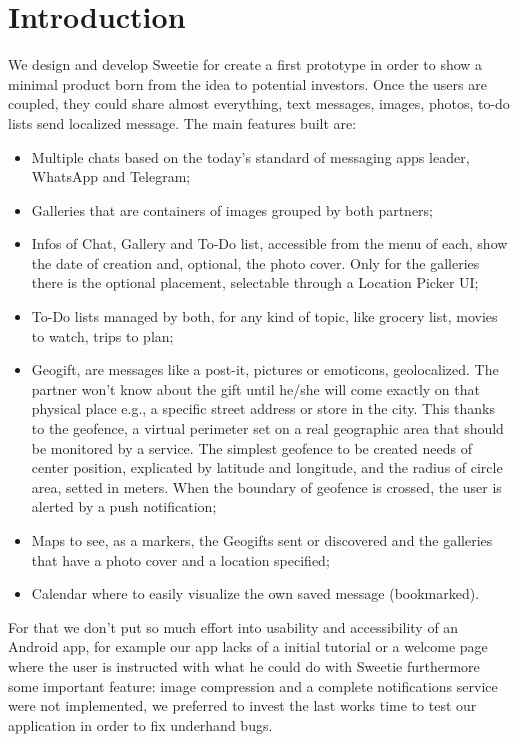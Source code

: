 
\section{Introduction}
\label{sec:introduction}


We design and develop Sweetie for create a first prototype in order to show a minimal product born from the idea to potential investors.
Once the users are coupled, they could share almost everything, text messages, images, photos, to-do lists send localized message. The main features built are:

\begin{itemize}
	\item Multiple chats based on the today's standard of messaging apps leader, WhatsApp and Telegram;
	\item Galleries that are containers of images grouped by both partners;
	\item Infos of Chat, Gallery and To-Do list, accessible from the menu of each, show the date of creation and, optional, the photo cover. Only for the galleries there is the optional placement, selectable through a Location Picker UI;
	\item To-Do lists managed by both, for any kind of topic, like grocery list, movies to watch, trips to plan;
	\item Geogift, are messages like a post-it, pictures or emoticons, geolocalized. The partner won't know about the gift until he/she will come exactly on that physical place e.g., a specific street address or store in the city. This thanks to the geofence, a virtual perimeter set on a real geographic area that should be monitored by a service. The simplest geofence to be created needs of center position, explicated by latitude and longitude, and the radius of circle area, setted in meters. When the boundary of geofence is crossed, the user is alerted by a push notification;
	\item Maps to see, as a markers, the Geogifts sent or discovered and the galleries that have a photo cover and a location specified;
	\item Calendar where to easily visualize the own saved message (bookmarked).
\end{itemize}

For that we don't put so much effort into usability and accessibility of an Android app, for example our app lacks of a initial tutorial or a welcome page where the user is instructed with what he could do with Sweetie furthermore some important feature: image compression and a complete notifications service were not implemented, we preferred to invest the last works time to test our application in order to fix underhand bugs.


